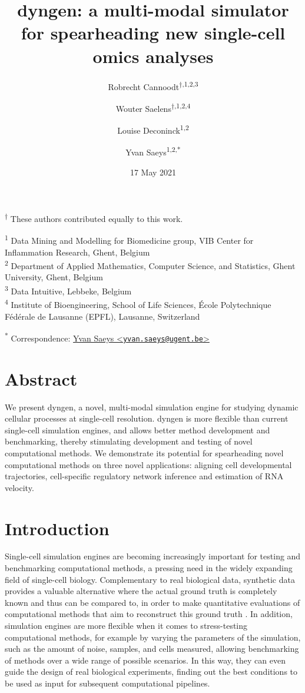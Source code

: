 \documentclass[
  table,
  10pt,
  a4paper]{article}
\title{dyngen: a multi-modal simulator for spearheading new single-cell
omics analyses}
\author{Robrecht Cannoodt\textsuperscript{$\dagger{}$,1,2,3} \and Wouter
Saelens\textsuperscript{$\dagger{}$,1,2,4} \and Louise
Deconinck\textsuperscript{1,2} \and Yvan Saeys\textsuperscript{1,2,*}}
\date{17 May 2021}
\begin{document}
\maketitle

\textsuperscript{$\dagger{}$}
These authors contributed equally to this work.

\textsuperscript{1} Data Mining and Modelling for Biomedicine group, VIB
Center for Inflammation Research, Ghent, Belgium\\
\textsuperscript{2} Department of Applied Mathematics, Computer Science,
and Statistics, Ghent University, Ghent, Belgium\\
\textsuperscript{3} Data Intuitive, Lebbeke, Belgium\\
\textsuperscript{4} Institute of Bioengineering, School of Life
Sciences, École Polytechnique Fédérale de Lausanne (EPFL), Lausanne,
Switzerland

\textsuperscript{*} Correspondence:
\href{mailto:yvan.saeys@ugent.be}{Yvan Saeys
\textless{}\href{mailto:yvan.saeys@ugent.be}{\nolinkurl{yvan.saeys@ugent.be}}\textgreater{}}

\hypertarget{abstract}{%
\section{Abstract}\label{abstract}}

We present dyngen, a novel, multi-modal simulation engine for studying
dynamic cellular processes at single-cell resolution. dyngen is more
flexible than current single-cell simulation engines, and allows better
method development and benchmarking, thereby stimulating development and
testing of novel computational methods. We demonstrate its potential for
spearheading novel computational methods on three novel applications:
aligning cell developmental trajectories, cell-specific regulatory
network inference and estimation of RNA velocity.

\hypertarget{introduction}{%
\section{Introduction}\label{introduction}}

Single-cell simulation engines are becoming increasingly important for
testing and benchmarking computational methods, a pressing need in the
widely expanding field of single-cell biology. Complementary to real
biological data, synthetic data provides a valuable alternative where
the actual ground truth is completely known and thus can be compared to,
in order to make quantitative evaluations of computational methods that
aim to reconstruct this ground truth
\autocite{zappia_splattersimulationsinglecell_2017}. In addition,
simulation engines are more flexible when it comes to stress-testing
computational methods, for example by varying the parameters of the
simulation, such as the amount of noise, samples, and cells measured,
allowing benchmarking of methods over a wide range of possible
scenarios. In this way, they can even guide the design of real
biological experiments, finding out the best conditions to be used as
input for subsequent computational pipelines.
\end{document}
